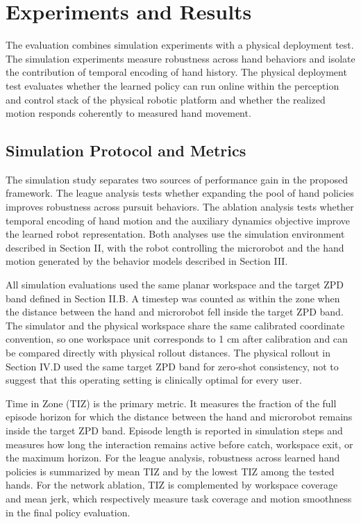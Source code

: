 \documentclass[journal,twoside,web]{ieeecolor2}
\begin{document}
\section{Experiments and Results}
The evaluation combines simulation experiments with a physical deployment test. The simulation experiments measure robustness across hand behaviors and isolate the contribution of temporal encoding of hand history. The physical deployment test evaluates whether the learned policy can run online within the perception and control stack of the physical robotic platform and whether the realized motion responds coherently to measured hand movement.

\subsection{Simulation Protocol and Metrics}
The simulation study separates two sources of performance gain in the proposed framework. The league analysis tests whether expanding the pool of hand policies improves robustness across pursuit behaviors. The ablation analysis tests whether temporal encoding of hand motion and the auxiliary dynamics objective improve the learned robot representation. Both analyses use the simulation environment described in Section II, with the robot controlling the microrobot and the hand motion generated by the behavior models described in Section III.

All simulation evaluations used the same planar workspace and the target ZPD band defined in Section II.B. A timestep was counted as within the zone when the distance between the hand and microrobot fell inside the target ZPD band. The simulator and the physical workspace share the same calibrated coordinate convention, so one workspace unit corresponds to 1 cm after calibration and can be compared directly with physical rollout distances. The physical rollout in Section IV.D used the same target ZPD band for zero-shot consistency, not to suggest that this operating setting is clinically optimal for every user.

Time in Zone (TIZ) is the primary metric. It measures the fraction of the full episode horizon for which the distance between the hand and microrobot remains inside the target ZPD band. Episode length is reported in simulation steps and measures how long the interaction remains active before catch, workspace exit, or the maximum horizon. For the league analysis, robustness across learned hand policies is summarized by mean TIZ and by the lowest TIZ among the tested hands. For the network ablation, TIZ is complemented by workspace coverage and mean jerk, which respectively measure task coverage and motion smoothness in the final policy evaluation.
\end{document}
